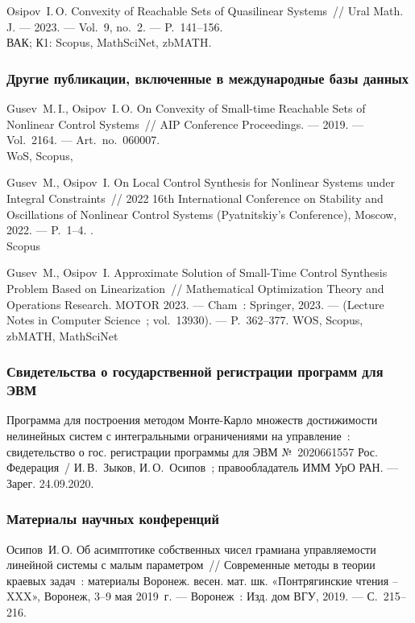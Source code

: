 \documentclass[../main.tex]{subfiles}
\begin{document}
\begin{thebibliography}{99}
Osipov~I.\,O. Convexity of Reachable Sets of Quasilinear Systems~// Ural Math. J. --- 2023. --- Vol.~9, no.~2. --- P.~141--156.
 \\
ВАК; К1: Scopus, MathSciNet, zbMATH.


\subsubsection*{Другие публикации, включенные в международные базы данных}
Gusev~M.\,I., Osipov~I.\,O. On Convexity of Small-time Reachable Sets of Nonlinear Control Systems~// AIP Conference Proceedings. --- 2019. --- Vol.~2164. --- Art.~no.~060007.
 \\
WoS, Scopus,

Gusev~M., Osipov~I. On Local Control Synthesis for Nonlinear Systems under Integral Constraints~// 2022 16th International Conference on Stability and Oscillations of Nonlinear Control Systems (Pyatnitskiy's Conference), Moscow, 2022. --- P.~1--4. .\\
Scopus

Gusev~M., Osipov~I. Approximate Solution of Small-Time Control Synthesis Problem Based on Linearization~// Mathematical Optimization Theory and Operations Research. MOTOR 2023. --- Cham~: Springer, 2023. --- (Lecture Notes in Computer Science~; vol.~13930). --- P.~362--377.
WOS, Scopus, zbMATH, MathSciNet

\subsubsection*{Свидетельства о государственной регистрации программ для ЭВМ}
Программа для построения методом Монте-Карло множеств достижимости нелинейных систем с интегральными ограничениями на управление~: свидетельство о гос. регистрации программы для ЭВМ №~2020661557 Рос. Федерация~/\! И.\,В.~Зыков, И.\,О.~Осипов~; правообладатель ИММ УрО РАН. --- Зарег. 24.09.2020.

\subsubsection*{Материалы научных конференций}

Осипов~И.\,О. Об асимптотике собственных чисел грамиана управляемости линейной системы с малым параметром~// Современные методы в теории краевых задач~: материалы Воронеж. весен. мат. шк. «Понтрягинские чтения – XXX», Воронеж, 3--9 мая 2019~г. --- Воронеж~: Изд. дом ВГУ, 2019. --- С.~215--216.


\end{thebibliography}
\end{document}
